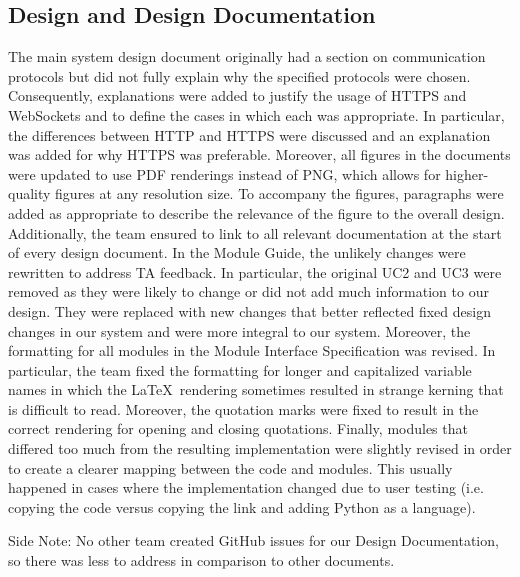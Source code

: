\documentclass[12pt, titlepage]{article}
\begin{document}
\subsection{Design and Design Documentation}
The main system design document originally had a section on communication protocols but did not fully explain why the specified protocols were chosen. Consequently, explanations were added to justify the usage of HTTPS and WebSockets and to define the cases in which each was appropriate. In particular, the differences between HTTP and HTTPS were discussed and an explanation was added for why HTTPS was preferable. Moreover, all figures in the documents were updated to use PDF renderings instead of PNG, which allows for higher-quality figures at any resolution size. To accompany the figures, paragraphs were added as appropriate to describe the relevance of the figure to the overall design. Additionally, the team ensured to link to all relevant documentation at the start of every design document. In the Module Guide, the unlikely changes were rewritten to address TA feedback. In particular, the original UC2 and UC3 were removed as they were likely to change or did not add much information to our design. They were replaced with new changes that better reflected fixed design changes in our system and were more integral to our system. Moreover, the formatting for all modules in the Module Interface Specification was revised. In particular, the team fixed the formatting for longer and capitalized variable names in which the \LaTeX \, rendering sometimes resulted in strange kerning that is difficult to read. Moreover, the quotation marks were fixed to result in the correct rendering for opening and closing quotations. Finally, modules that differed too much from the resulting implementation were slightly revised in order to create a clearer mapping between the code and modules. This usually happened in cases where the implementation changed due to user testing (i.e. copying the code versus copying the link and adding Python as a language).

Side Note: No other team created GitHub issues for our Design Documentation, so there was less to address in comparison to other documents.
\end{document}
